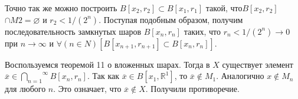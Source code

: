 Точно так же можно построить $B[x_2, r_2]  \subset B[x_1, r_1]$  такой,
что$ B[x_2, r_2]$$\cap M2 = \varnothing$ и $r_2 < 1/(2^n)$.
    Поступая подобным образом, получим последовательность замкнутых шаров
${B[x_n, r_n]}$ таких, что $r_n < 1/(2^n)\rightarrow 0$
    при $n\rightarrow \infty$  и $\forall(n \in  N) [ B[x_{n+1}, r_{n+1}] \subset B[x_n, r_n]]$.

    Воспользуемся теоремой 11 о вложенных шарах. Тогда в $X$ существует
    элемент  $\overline{x}  \in  \stackrel{\infty}{\underset{n=1}{\bigcap}} B[x_n, r_n]$.
    Так  как    $\overline{x}\in  B[x_1, \mathbb{R}^1]$,  то
$\overline{x} \notin M_1$.  Аналогично
$x \notin   M_n$  для любого $n$. Это означает, что $\overline{x} \notin X$. Получили противоречие.

\noindent\dotfill
    
